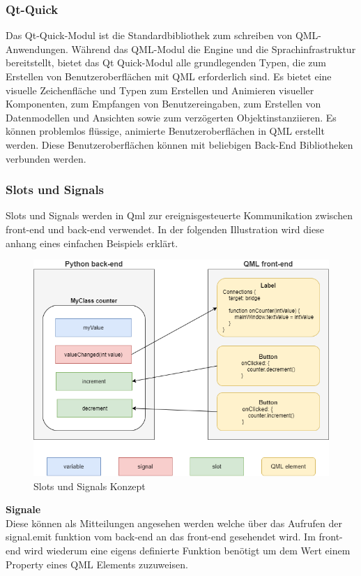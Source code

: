 \subsubsection{Qt-Quick}
Das Qt-Quick-Modul ist die Standardbibliothek zum schreiben von QML-Anwendungen. Während das QML-Modul die Engine und die Sprachinfrastruktur bereitstellt, bietet das Qt Quick-Modul alle grundlegenden Typen, die zum Erstellen von Benutzeroberflächen mit QML erforderlich sind. Es bietet eine visuelle Zeichenfläche und Typen zum Erstellen und Animieren visueller Komponenten, zum Empfangen von Benutzereingaben, zum Erstellen von Datenmodellen und Ansichten sowie zum verzögerten Objektinstanziieren. Es können problemlos flüssige, animierte Benutzeroberflächen in QML erstellt werden. Diese Benutzeroberflächen können mit beliebigen Back-End Bibliotheken verbunden werden.

\subsubsection{Slots und Signals}
Slots und Signals werden in Qml zur ereignisgesteuerte Kommunikation zwischen front-end und back-end verwendet. In der folgenden Illustration wird diese anhang eines einfachen Beispiels erklärt.

\begin{figure}[H]
\begin{center}
\includegraphics[scale=0.4]{figures/hcis/signals_slots.png}
\caption{Slots und Signals Konzept}
\end{center}
\end{figure}

\textbf{Signale}\\ \medskip
Diese können als Mitteilungen angesehen werden welche über das Aufrufen der signal.emit funktion vom back-end an das front-end gesehendet wird. Im front-end wird wiederum eine eigens definierte Funktion benötigt um dem Wert einem Property eines QML Elements zuzuweisen.
\medskip

